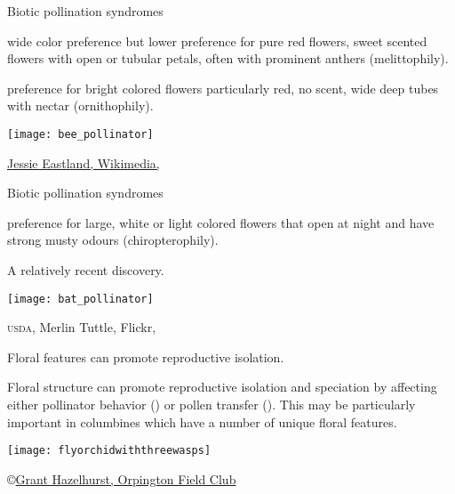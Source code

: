 \documentclass[t,hidelinks]{beamer}
\begin{document}
\begin{frame}[t]{Biotic pollination syndromes}

	\begin{multicols}{2}
	\hangpara {} wide color preference but lower preference for pure red flowers, sweet scented flowers with open or tubular petals, often with prominent anthers (melittophily).
	
	\hangpara {} preference for bright colored flowers particularly red, no scent, wide deep tubes with nectar (ornithophily).

	\columnbreak
	
		\texttt{[image: bee\_pollinator]}
	
	\end{multicols}
	
	\vfilll
	
	\hfill \tiny \href{https://commons.wikimedia.org/wiki/File:Diadasia_Bee_Straddles_Cactus_Flower_Carpels_close-up.jpg}{Jessie Eastland, Wikimedia, }
\end{frame}
%
\begin{frame}[t]{Biotic pollination syndromes}

	\begin{multicols}{2}
	\hangpara {} preference for large, white or light colored flowers that open at night and have strong musty odours (chiropterophily).
	
	\hangpara {} A relatively recent discovery.
	
	\columnbreak
	
		\texttt{[image: bat\_pollinator]}
	\end{multicols}

	\vfilll
	
	\hfill \tiny \textsc{usda}, Merlin Tuttle, Flickr, 
\end{frame}
%
\begin{frame}[t]{Floral features can promote reproductive isolation.}
	
	\begin{multicols}{2}
	\hangpara Floral structure can promote reproductive isolation and speciation by affecting either pollinator behavior () or pollen transfer (). This may be particularly important in columbines which have a number of unique floral features.  

	\columnbreak
	
		\texttt{[image: flyorchidwiththreewasps]}	
	\end{multicols}

	\vfilll
	
	\hfill \tiny \copyright \href{http://www.orpingtonfieldclub.org.uk/ofc-article002.html}{Grant Hazelhurst, Orpington Field Club}
\end{frame}
\end{document}
